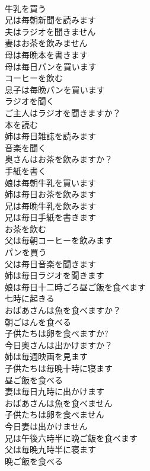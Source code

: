 \documentclass[8pt]{extreport}
\begin{document}
\begin{CJK}{UTF8}{min}
\\	牛乳を買う	
\\	兄は毎朝新聞を読みます	
\\	夫はラジオを聞きません	
\\	妻はお茶を飲みません	
\\	母は毎晩本を書きます	
\\	母は毎日パンを買います	
\\	コーヒーを飲む	
\\	息子は毎晩パンを買います	
\\	ラジオを聞く	
\\	ご主人はラジオを聞きますか？	
\\	本を読む	
\\	姉は毎日雑誌を読みます	
\\	音楽を聞く	
\\	奥さんはお茶を飲みますか？	
\\	手紙を書く	
\\	娘は毎朝牛乳を買います	
\\	姉は毎日お茶を飲みます	
\\	兄は毎晩牛乳を飲みます	
\\	兄は毎日手紙を書きます	
\\	お茶を飲む	
\\	父は毎朝コーヒーを飲みます	
\\	パンを買う	
\\	父は毎日音楽を聞きます	
\\	姉は毎日ラジオを聞きます	
\\	娘は毎日十二時ごろ昼ご飯を食べます	
\\	七時に起きる	
\\	おばあさんは魚を食べますか？	
\\	朝ごはんを食べる	
\\	子供たちは卵を食べますか?	
\\	今日奥さんは出かけますか？	
\\	姉は毎週映画を見ます	
\\	子供たちは毎晩十時に寝ます	
\\	昼ご飯を食べる	
\\	妻は毎日九時に出かけます	
\\	おばあさんは魚を食べません	
\\	子供たちは卵を食べません	
\\	今日妻は出かけません	
\\	兄は午後六時半に晩ご飯を食べます	
\\	父は毎晩九時半に寝ます	
\\	晩ご飯を食べる	

\end{CJK}
\end{document}
